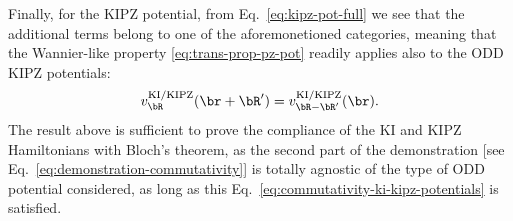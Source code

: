 Finally, for the KIPZ potential, from Eq.~\eqref{eq:kipz-pot-full} we see that the additional terms belong to one of the aforemonetioned categories, meaning that the Wannier-like property \eqref{eq:trans-prop-pz-pot} readily applies also to the ODD KIPZ potentials:
%
\begin{equation}
    v^{\rm KI/KIPZ}_{\bR}(\br+\bR') = v^{\rm KI/KIPZ}_{\bR-\bR'}(\br) .
    \label{eq:commutativity-ki-kipz-potentials}
\end{equation}
%
    The result above is sufficient to prove the compliance of the KI and KIPZ Hamiltonians with Bloch's theorem, as the second part of the demonstration [see Eq.~\eqref{eq:demonstration-commutativity}] is totally agnostic of the type of ODD potential considered, as long as this Eq.~\eqref{eq:commutativity-ki-kipz-potentials} is satisfied.
